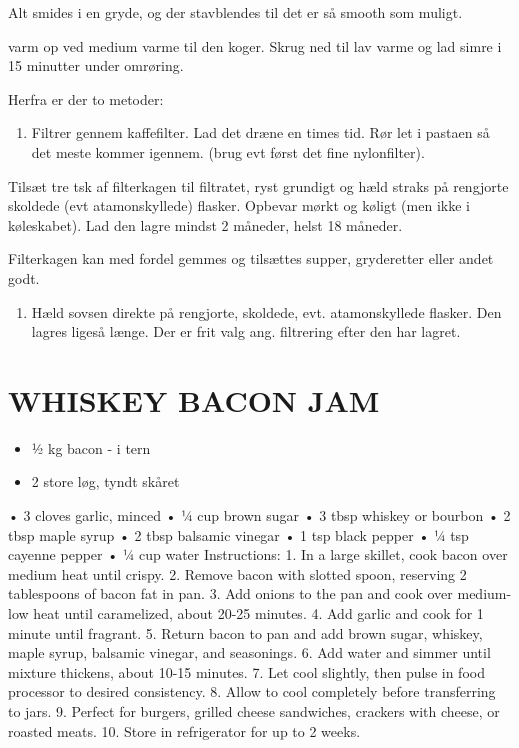 \documentclass[
]{book}
\providecommand{\tightlist}{%
  \setlength{\itemsep}{0pt}\setlength{\parskip}{0pt}}
\begin{document}
Alt smides i en gryde, og der stavblendes til det er så smooth som muligt.

varm op ved medium varme til den koger. Skrug ned til lav varme og lad simre
i 15 minutter under omrøring.

Herfra er der to metoder:

\begin{enumerate}
\def\labelenumi{\arabic{enumi}.}
\tightlist
\item
  Filtrer gennem kaffefilter. Lad det dræne en times tid. Rør let i pastaen
  så det meste kommer igennem. (brug evt først det fine nylonfilter).
\end{enumerate}

Tilsæt tre tsk af filterkagen til filtratet, ryst grundigt og hæld straks på
rengjorte skoldede (evt atamonskyllede) flasker. Opbevar mørkt og køligt
(men ikke i køleskabet). Lad den lagre mindst 2 måneder, helst 18 måneder.

Filterkagen kan med fordel gemmes og tilsættes supper, gryderetter eller andet godt.

\begin{enumerate}
\def\labelenumi{\arabic{enumi}.}
\setcounter{enumi}{1}
\tightlist
\item
  Hæld sovsen direkte på rengjorte, skoldede, evt. atamonskyllede flasker.
  Den lagres ligeså længe. Der er frit valg ang. filtrering efter den har lagret.
\end{enumerate}

\section{WHISKEY BACON JAM}\label{whiskey-bacon-jam}

\begin{itemize}
\tightlist
\item
  ½ kg bacon - i tern
\item
  2 store løg, tyndt skåret
\end{itemize}

• 3 cloves garlic, minced
• ¼ cup brown sugar
• 3 tbsp whiskey or bourbon
• 2 tbsp maple syrup
• 2 tbsp balsamic vinegar
• 1 tsp black pepper
• ¼ tsp cayenne pepper
• ¼ cup water
Instructions:
1. In a large skillet, cook bacon over medium heat until crispy.
2. Remove bacon with slotted spoon, reserving 2 tablespoons of bacon fat in pan.
3. Add onions to the pan and cook over medium-low heat until caramelized, about 20-25 minutes.
4. Add garlic and cook for 1 minute until fragrant.
5. Return bacon to pan and add brown sugar, whiskey, maple syrup, balsamic vinegar, and seasonings.
6. Add water and simmer until mixture thickens, about 10-15 minutes.
7. Let cool slightly, then pulse in food processor to desired consistency.
8. Allow to cool completely before transferring to jars.
9. Perfect for burgers, grilled cheese sandwiches, crackers with cheese, or roasted meats.
10. Store in refrigerator for up to 2 weeks.
\end{document}
